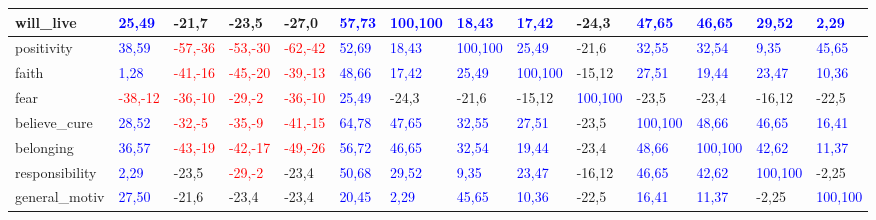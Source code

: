 \begin{table}[H]
\begin{adjustbox}{angle=270}
\begin{tabular} {|l|l|l|l|l|l|l|l|l|l|l|l|l|l|}
 \hline 
 will\_live & {\textcolor{blue}{25,49}} & -21,7 & -23,5 & -27,0 & {\textcolor{blue}{57,73}} & {\textcolor{blue}{100,100}} & {\textcolor{blue}{18,43}} & {\textcolor{blue}{17,42}} & -24,3 & {\textcolor{blue}{47,65}} & {\textcolor{blue}{46,65}} & {\textcolor{blue}{29,52}} & {\textcolor{blue}{2,29}} \\ 
 \hline 
 positivity & {\textcolor{blue}{38,59}} & {\textcolor{red}{-57,-36}} & {\textcolor{red}{-53,-30}} & {\textcolor{red}{-62,-42}} & {\textcolor{blue}{52,69}} & {\textcolor{blue}{18,43}} & {\textcolor{blue}{100,100}} & {\textcolor{blue}{25,49}} & -21,6 & {\textcolor{blue}{32,55}} & {\textcolor{blue}{32,54}} & {\textcolor{blue}{9,35}} & {\textcolor{blue}{45,65}} \\ 
 \hline 
 faith & {\textcolor{blue}{1,28}} & {\textcolor{red}{-41,-16}} & {\textcolor{red}{-45,-20}} & {\textcolor{red}{-39,-13}} & {\textcolor{blue}{48,66}} & {\textcolor{blue}{17,42}} & {\textcolor{blue}{25,49}} & {\textcolor{blue}{100,100}} & -15,12 & {\textcolor{blue}{27,51}} & {\textcolor{blue}{19,44}} & {\textcolor{blue}{23,47}} & {\textcolor{blue}{10,36}} \\ 
 \hline 
 fear & {\textcolor{red}{-38,-12}} & {\textcolor{red}{-36,-10}} & {\textcolor{red}{-29,-2}} & {\textcolor{red}{-36,-10}} & {\textcolor{blue}{25,49}} & -24,3 & -21,6 & -15,12 & {\textcolor{blue}{100,100}} & -23,5 & -23,4 & -16,12 & -22,5 \\ 
 \hline 
 believe\_cure & {\textcolor{blue}{28,52}} & {\textcolor{red}{-32,-5}} & {\textcolor{red}{-35,-9}} & {\textcolor{red}{-41,-15}} & {\textcolor{blue}{64,78}} & {\textcolor{blue}{47,65}} & {\textcolor{blue}{32,55}} & {\textcolor{blue}{27,51}} & -23,5 & {\textcolor{blue}{100,100}} & {\textcolor{blue}{48,66}} & {\textcolor{blue}{46,65}} & {\textcolor{blue}{16,41}} \\ 
 \hline 
 belonging & {\textcolor{blue}{36,57}} & {\textcolor{red}{-43,-19}} & {\textcolor{red}{-42,-17}} & {\textcolor{red}{-49,-26}} & {\textcolor{blue}{56,72}} & {\textcolor{blue}{46,65}} & {\textcolor{blue}{32,54}} & {\textcolor{blue}{19,44}} & -23,4 & {\textcolor{blue}{48,66}} & {\textcolor{blue}{100,100}} & {\textcolor{blue}{42,62}} & {\textcolor{blue}{11,37}} \\ 
 \hline 
 responsibility & {\textcolor{blue}{2,29}} & -23,5 & {\textcolor{red}{-29,-2}} & -23,4 & {\textcolor{blue}{50,68}} & {\textcolor{blue}{29,52}} & {\textcolor{blue}{9,35}} & {\textcolor{blue}{23,47}} & -16,12 & {\textcolor{blue}{46,65}} & {\textcolor{blue}{42,62}} & {\textcolor{blue}{100,100}} & -2,25 \\ 
 \hline 
 general\_motiv & {\textcolor{blue}{27,50}} & -21,6 & -23,4 & -23,4 & {\textcolor{blue}{20,45}} & {\textcolor{blue}{2,29}} & {\textcolor{blue}{45,65}} & {\textcolor{blue}{10,36}} & -22,5 & {\textcolor{blue}{16,41}} & {\textcolor{blue}{11,37}} & -2,25 & {\textcolor{blue}{100,100}} \\ 
 \hline 
 \hline 
 \end{tabular} 
\end{adjustbox}  
\end{table} 
